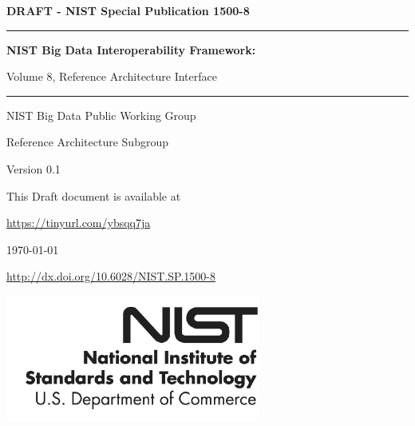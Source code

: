 %
%


\begin{flushright}
{\Large\bf DRAFT - NIST Special Publication 1500-8} 

\bigskip\bigskip

\hrule
\bigskip\bigskip

{\Huge\bf \sf
NIST Big Data Interoperability Framework:

\bigskip

Volume 8, Reference Architecture Interface
}


\bigskip\bigskip
\hrule

\vspace{2cm}

{\large

NIST Big Data Public Working Group

Reference Architecture Subgroup

\vspace{2cm}

Version 0.1

\bigskip

This Draft document is available at


\url{https://tinyurl.com/ybsqq7ja}

\bigskip

\today

\bigskip
\url{http://dx.doi.org/10.6028/NIST.SP.1500-8}

}
\vspace{2cm}

\vfill

\begin{flushright}
\includegraphics{images/nist.png}
\end{flushright}

\end{flushright}

